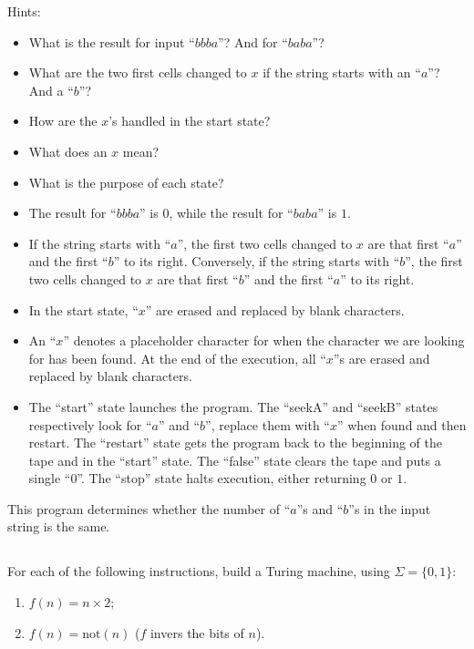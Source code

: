 Hints:
\begin{itemize}
	\item What is the result for input ``\(bbba\)''?
	And for ``\(baba\)''?
	\item What are the two first cells changed to \(x\)
	if the string starts with an ``\(a\)''?
	And a ``\(b\)''?
	\item How are the \(x\)'s handled in the start state?
	\item What does an \(x\) mean?
	\item What is the purpose of each state?
\end{itemize}

\begin{solution}
	\begin{itemize}
		\item The result for ``\(bbba\)'' is \(0\),
		while the result for ``\(baba\)'' is \(1\).
		\item If the string starts with ``\(a\)'',
		the first two cells changed to \(x\) are that first ``\(a\)''
		and the first ``\(b\)'' to its right.
		Conversely, if the string starts with ``\(b\)'',
		the first two cells changed to \(x\) are that first ``\(b\)''
		and the first ``\(a\)'' to its right.
		\item In the start state, ``\(x\)''
		are erased and replaced by blank characters.
		\item An ``\(x\)'' denotes a placeholder character
		for when the character we are looking for has been found.
		At the end of the execution, all ``\(x\)''s
		are erased and replaced by blank characters.
		\item The ``start'' state launches the program.
		The ``seekA'' and ``seekB'' states
		respectively look for ``\(a\)'' and ``\(b\)'',
		replace them with ``\(x\)'' when found and then restart.
		The ``restart'' state gets the program
		back to the beginning of the tape and in the ``start'' state.
		The ``false'' state clears the tape and puts a single ``\(0\)''.
		The ``stop'' state halts execution,
		either returning \(0\) or \(1\).
	\end{itemize}

	This program determines whether the number of ``\(a\)''s and ``\(b\)''s
	in the input string is the same.
\end{solution}

\subsection{} %
For each of the following instructions, build a Turing machine,
using \(\Sigma = \{0, 1\}\):
\begin{enumerate}
	\item \(f(n) = n \times 2\);
	\item \(f(n) = \mathrm{not}(n)\) (\(f\) invers the bits of \(n\)).
\end{enumerate}

